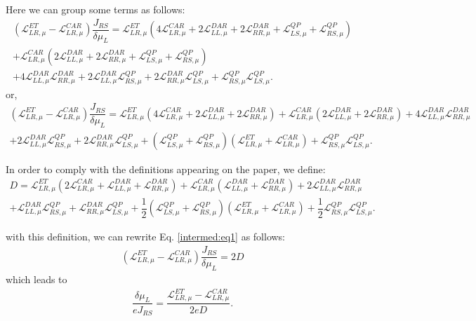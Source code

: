 Here we can group some terms as follows:
\begin{multline*}
(\mathcal{L}_{LR,\mu}^{ET}-\mathcal{L}_{LR,\mu}^{CAR})\dfrac{J_{RS}}{\delta\mu_{L}}=
\mathcal{L}_{LR,\mu}^{ET}(4\mathcal{L}_{LR,\mu}^{CAR}
+
2\mathcal{L}_{LL,\mu}^{DAR}+2\mathcal{L}_{RR,\mu}^{DAR}+\mathcal{L}^{QP}_{LS,\mu}+\mathcal{L}^{QP}_{RS,\mu})
\\+
\mathcal{L}_{LR,\mu}^{CAR}(2\mathcal{L}_{LL,\mu}^{DAR}+2\mathcal{L}_{RR,\mu}^{DAR}+\mathcal{L}^{QP}_{LS,\mu}+\mathcal{L}^{QP}_{RS,\mu})
\\+
4\mathcal{L}_{LL,\mu}^{DAR}\mathcal{L}_{RR,\mu}^{DAR}
+
2\mathcal{L}_{LL,\mu}^{DAR}\mathcal{L}^{QP}_{RS,\mu}
+
2\mathcal{L}_{RR,\mu}^{DAR}\mathcal{L}^{QP}_{LS,\mu}
+
\mathcal{L}^{QP}_{RS,\mu}\mathcal{L}^{QP}_{LS,\mu}.
\end{multline*}
or,
\begin{multline}\label{intermed:eq1}
(\mathcal{L}_{LR,\mu}^{ET}-\mathcal{L}_{LR,\mu}^{CAR})\dfrac{J_{RS}}{\delta\mu_{L}}=
\mathcal{L}_{LR,\mu}^{ET}(4\mathcal{L}_{LR,\mu}^{CAR}
+
2\mathcal{L}_{LL,\mu}^{DAR}+2\mathcal{L}_{RR,\mu}^{DAR})
+
\mathcal{L}_{LR,\mu}^{CAR}(2\mathcal{L}_{LL,\mu}^{DAR}+2\mathcal{L}_{RR,\mu}^{DAR})
+
4\mathcal{L}_{LL,\mu}^{DAR}\mathcal{L}_{RR,\mu}^{DAR}
\\+
2\mathcal{L}_{LL,\mu}^{DAR}\mathcal{L}^{QP}_{RS,\mu}
+
2\mathcal{L}_{RR,\mu}^{DAR}\mathcal{L}^{QP}_{LS,\mu}
+(\mathcal{L}^{QP}_{LS,\mu}+\mathcal{L}^{QP}_{RS,\mu})(\mathcal{L}_{LR,\mu}^{ET}+\mathcal{L}_{LR,\mu}^{CAR})+
\mathcal{L}^{QP}_{RS,\mu}\mathcal{L}^{QP}_{LS,\mu}.
\end{multline}


In order to comply with the definitions appearing on the paper, we define:
\begin{multline}\label{D:def}
D=
\mathcal{L}_{LR,\mu}^{ET}(2\mathcal{L}_{LR,\mu}^{CAR}
+
\mathcal{L}_{LL,\mu}^{DAR}+\mathcal{L}_{RR,\mu}^{DAR})
+
\mathcal{L}_{LR,\mu}^{CAR}(\mathcal{L}_{LL,\mu}^{DAR}+\mathcal{L}_{RR,\mu}^{DAR})
+
2\mathcal{L}_{LL,\mu}^{DAR}\mathcal{L}_{RR,\mu}^{DAR}
\\+
\mathcal{L}_{LL,\mu}^{DAR}\mathcal{L}^{QP}_{RS,\mu}
+
\mathcal{L}_{RR,\mu}^{DAR}\mathcal{L}^{QP}_{LS,\mu}
+
\dfrac{1}{2}(\mathcal{L}^{QP}_{LS,\mu}+\mathcal{L}^{QP}_{RS,\mu})(\mathcal{L}_{LR,\mu}^{ET}+\mathcal{L}_{LR,\mu}^{CAR})
+
\dfrac{1}{2}\mathcal{L}^{QP}_{RS,\mu}\mathcal{L}^{QP}_{LS,\mu}.
\end{multline}

with this definition, we can rewrite Eq. \eqref{intermed:eq1} as follows:
\begin{align}
(\mathcal{L}_{LR,\mu}^{ET}-\mathcal{L}_{LR,\mu}^{CAR})\dfrac{J_{RS}}{\delta\mu_{L}}=
2D
\end{align}
which leads to
\begin{align}\label{R:RS:LS:intermed}
\dfrac{\delta\mu_{L}}{eJ_{RS}}=\dfrac{\mathcal{L}_{LR,\mu}^{ET}-\mathcal{L}_{LR,\mu}^{CAR}}{2eD}.
\end{align}

